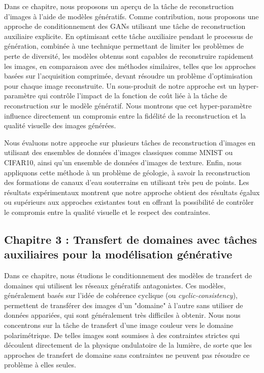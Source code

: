 {Dans ce chapitre, nous proposons un aperçu de la tâche de reconstruction d'images à l'aide de modèles génératifs. Comme contribution, nous proposons une approche de conditionnement des \ac{GANs} utilisant une tâche de reconstruction auxiliaire explicite. En optimisant cette tâche auxiliaire pendant le processus de génération, combinée à une technique permettant de limiter les problèmes de perte de diversité, les modèles obtenus sont capables de reconstruire rapidement les images, en comparaison avec des méthodes similaires, telles que les approches basées sur l'acquisition comprimée, devant résoudre un problème d'optimisation pour chaque image reconstruite.  Un sous-produit de notre approche est un hyper-paramètre qui contrôle l'impact de la fonction de coût liée à la tâche de reconstruction sur le modèle génératif. Nous montrons que cet hyper-paramètre influence directement un compromis entre la fidélité de la reconstruction et la qualité visuelle des images générées. 

Nous évaluons notre approche sur plusieurs tâches de reconstruction d'images en utilisant des ensembles de données d'images classiques comme MNIST ou CIFAR10, ainsi qu'un ensemble de données d'images de texture. Enfin, nous appliquons cette méthode à un problème de géologie, à savoir la reconstruction des formations de canaux d'eau souterrains en utilisant très peu de points.  Les résultats expérimentaux montrent que notre approche obtient des résultats égalux ou supérieurs aux approches existantes tout en offrant la possibilité de contrôler le compromis entre la qualité visuelle et le respect des contraintes.


\subsection*{Chapitre 3 : Transfert de domaines avec tâches auxiliaires pour la modélisation générative}

Dans ce chapitre, nous étudions le conditionnement des modèles de transfert de domaines qui utilisent les réseaux génératifs antagonistes. Ces modèles, généralement basés sur l'idée de cohérence cyclique (ou \textit{cyclic-consistency}), permettent de transférer des images d'un "domaine" à l'autre sans utiliser de données appariées, qui sont généralement très difficiles à obtenir. Nous nous concentrons sur la tâche de transfert d'une image couleur vers le domaine polarimétrique. De telles images sont soumises à des contraintes strictes qui découlent directement de la physique ondulatoire de la lumière, de sorte que les approches de transfert de domaine sans contraintes ne peuvent pas résoudre ce problème à elles seules. 

}
